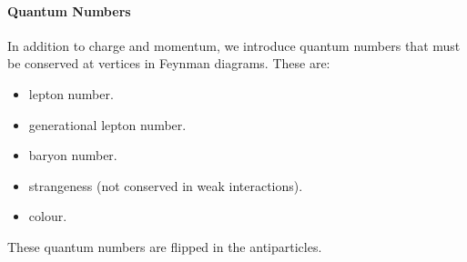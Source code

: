 \paragraph{Quantum Numbers}
In addition to charge and momentum, we introduce quantum numbers that must be conserved at vertices in Feynman diagrams. These are:
\begin{itemize}
	\item lepton number.
	\item generational lepton number.
	\item baryon number.
	\item strangeness (not conserved in weak interactions).
	\item colour.
\end{itemize}
These quantum numbers are flipped in the antiparticles.